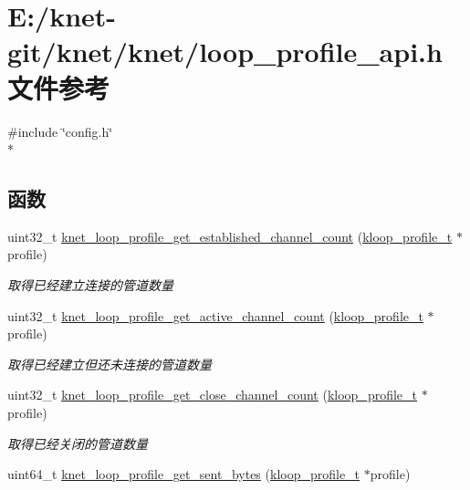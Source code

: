 \hypertarget{a00097}{}\section{E\+:/knet-\/git/knet/knet/loop\+\_\+profile\+\_\+api.h 文件参考}
\label{a00097}
{\ttfamily \#include \char`\"{}config.\+h\char`\"{}}\\*
\subsection*{函数}
\begin{DoxyCompactItemize}
\item 
uint32\+\_\+t \hyperlink{a00097_a30be8a49214eb1485429bdff63541dfc_a30be8a49214eb1485429bdff63541dfc}{knet\+\_\+loop\+\_\+profile\+\_\+get\+\_\+established\+\_\+channel\+\_\+count} (\hyperlink{a00066_ab75a5c23099a6118c469ed160b277f28_ab75a5c23099a6118c469ed160b277f28}{kloop\+\_\+profile\+\_\+t} $\ast$profile)
\begin{DoxyCompactList}\small\item\em 取得已经建立连接的管道数量 \end{DoxyCompactList}\item 
uint32\+\_\+t \hyperlink{a00097_a9b4aceae0c7a1f1aa86c8db5996ec76a_a9b4aceae0c7a1f1aa86c8db5996ec76a}{knet\+\_\+loop\+\_\+profile\+\_\+get\+\_\+active\+\_\+channel\+\_\+count} (\hyperlink{a00066_ab75a5c23099a6118c469ed160b277f28_ab75a5c23099a6118c469ed160b277f28}{kloop\+\_\+profile\+\_\+t} $\ast$profile)
\begin{DoxyCompactList}\small\item\em 取得已经建立但还未连接的管道数量 \end{DoxyCompactList}\item 
uint32\+\_\+t \hyperlink{a00097_a6eaacce21d69455a4e70bd6da4927082_a6eaacce21d69455a4e70bd6da4927082}{knet\+\_\+loop\+\_\+profile\+\_\+get\+\_\+close\+\_\+channel\+\_\+count} (\hyperlink{a00066_ab75a5c23099a6118c469ed160b277f28_ab75a5c23099a6118c469ed160b277f28}{kloop\+\_\+profile\+\_\+t} $\ast$profile)
\begin{DoxyCompactList}\small\item\em 取得已经关闭的管道数量 \end{DoxyCompactList}\item 
uint64\+\_\+t \hyperlink{a00097_a5bb651c97109287f36481c70c4096d02_a5bb651c97109287f36481c70c4096d02}{knet\+\_\+loop\+\_\+profile\+\_\+get\+\_\+sent\+\_\+bytes} (\hyperlink{a00066_ab75a5c23099a6118c469ed160b277f28_ab75a5c23099a6118c469ed160b277f28}{kloop\+\_\+profile\+\_\+t} $\ast$profile)

\end{DoxyCompactItemize}
